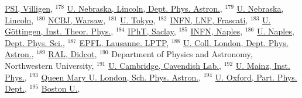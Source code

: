 {\href{http://inspirehep.net/record/905405}{PSI, Villigen}, $^{178}$ \href{http://inspirehep.net/record/903057}{U. Nebraska, Lincoln, Dept. Phys. Astron.}, $^{179}$ \href{http://inspirehep.net/record/1273761}{U. Nebraska, Lincoln}, $^{180}$ \href{http://inspirehep.net/record/1658555}{NCBJ, Warsaw}, $^{181}$ \href{http://inspirehep.net/record/1209632}{U. Tokyo}, $^{182}$ \href{http://inspirehep.net/record/902807}{INFN, LNF, Frascati}, $^{183}$ \href{http://inspirehep.net/record/902826}{U. G\"ottingen, Inst. Theor. Phys.}, $^{184}$ \href{http://inspirehep.net/record/1087875}{IPhT, Saclay}, $^{185}$ \href{http://inspirehep.net/record/902883}{INFN, Naples}, $^{186}$ \href{http://inspirehep.net/record/903043}{U. Naples, Dept. Phys. Sci.}, $^{187}$ \href{http://inspirehep.net/record/1471035}{EPFL, Lausanne, LPTP}, $^{188}$ \href{http://inspirehep.net/record/903311}{U. Coll. London, Dept. Phys. Astron.}, $^{189}$ \href{http://inspirehep.net/record/903174}{RAL, Didcot}, $^{190}$ Department of Physics and Astronomy, Northwestern University, $^{191}$ \href{http://inspirehep.net/record/902712}{U. Cambridge, Cavendish Lab.}, $^{192}$ \href{http://inspirehep.net/record/902982}{U. Mainz, Inst. Phys.}, $^{193}$ \href{http://inspirehep.net/record/903146}{Queen Mary U. London, Sch. Phys. Astron.}, $^{194}$ \href{http://inspirehep.net/record/903112}{U. Oxford, Part. Phys. Dept.}, $^{195}$ \href{http://inspirehep.net/record/945903}{Boston U.},  }\normalsize